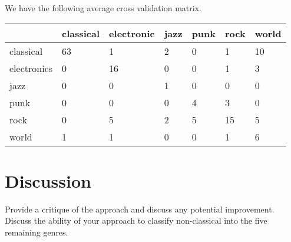 \documentclass[12pt]{article}
\begin{document}
We have the following average cross validation matrix. 
\begin{center}
 \begin{tabular}{l| |l | l | l | l | l | l | }
&classical &electronic& jazz &punk& rock &world \\ \hline \hline
classical &63 & 1 & 2 & 0 & 1 & 10 \\ \hline 
electronics& 0 & 16 & 0 & 0 & 1 & 3 \\ \hline 
jazz& 0 & 0 & 1 & 0 & 0 & 0 \\ \hline 
punk &0 & 0 & 0 & 4 & 3 & 0 \\ \hline 
rock& 0 & 5 & 2 & 5 & 15 & 5 \\ \hline 
world&1 & 1 & 0 & 0 & 1 & 6 \\ \hline 
\end{tabular}
\end{center}
\section{Discussion}
Provide a critique of the approach and discuss any potential
improvement. Discuss the ability of your approach to classify
non-classical into the five remaining genres.
\end{document}
